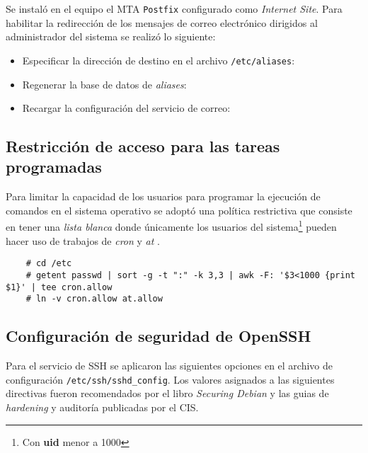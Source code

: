 Se instal\'{o} en el equipo el \textsc{MTA} \texttt{Postfix} configurado como \textit{Internet Site}. Para habilitar la redirecci\'{o}n de los mensajes de correo electr\'{o}nico dirigidos al administrador del sistema se realiz\'{o} lo siguiente:

\begin{itemize}
  \item Especificar la direcci\'{o}n de destino en el archivo \texttt{/etc/aliases}:

  \item Regenerar la base de datos de \textit{aliases}:

  \item Recargar la configuraci\'{o}n del servicio de correo:
\end{itemize}

      \subsection {Restricci\'{o}n de acceso para las tareas programadas}

Para limitar la capacidad de los usuarios para programar la ejecuci\'{o}n de comandos en el sistema operativo se adopt\'{o} una pol\'{i}tica restrictiva que consiste en tener una \textit{lista blanca} donde \'{u}nicamente los usuarios del sistema\footnote{Con \textbf{uid} menor a 1000} pueden hacer uso de trabajos de \textsl{cron} y \textsl{at} \cite{_debian_????-1} \cite{_crontab_????} \cite{_at_????}.

{
\scriptsize
\linespread{1}
\begin{verbatim}
    # cd /etc
    # getent passwd | sort -g -t ":" -k 3,3 | awk -F: '$3<1000 {print $1}' | tee cron.allow
    # ln -v cron.allow at.allow
\end{verbatim}
}

      \subsection {Configuraci\'{o}n de seguridad de \textup{OpenSSH}}

Para el servicio de \textsc{SSH} se aplicaron las siguientes opciones en el archivo de configuraci\'{o}n \texttt{/etc/ssh/sshd\_config}. Los valores asignados a las siguientes directivas fueron recomendados por el libro \emph{Securing Debian}\cite{_securing_????} y las guias de \emph{hardening} y auditor\'{i}a publicadas por el \textsc{CIS}\cite{_benchmarks_????}.

